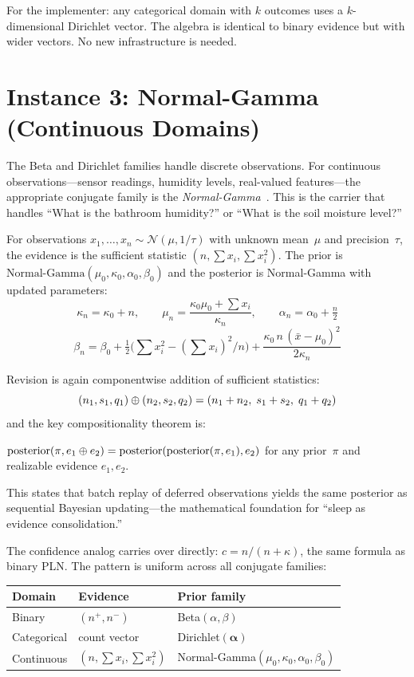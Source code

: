 \documentclass[11pt,openany]{report}
\begin{document}
For the implementer: any categorical domain with $k$ outcomes uses
a $k$-dimensional Dirichlet vector.  The algebra is identical to
binary evidence but with wider vectors.  No new infrastructure is
needed.

\section{Instance 3: Normal-Gamma (Continuous Domains)}
\label{sec:normal-gamma}

The Beta and Dirichlet families handle discrete observations.  For
continuous observations---sensor readings, humidity levels, real-valued
features---the appropriate conjugate family is the
\emph{Normal-Gamma}~\cite{BernardoSmith2000}.  This is the carrier
that handles ``What is the bathroom humidity?'' or ``What is the soil
moisture level?''

For observations $x_1, \ldots, x_n \sim \mathcal{N}(\mu, 1/\tau)$
with unknown mean~$\mu$ and precision~$\tau$, the evidence is the
sufficient statistic $(n, \textstyle\sum x_i, \sum x_i^2)$.  The prior
is $\text{Normal-Gamma}(\mu_0, \kappa_0, \alpha_0, \beta_0)$ and the
posterior is Normal-Gamma with updated parameters:
\[
  \kappa_n = \kappa_0 + n, \qquad
  \mu_n = \frac{\kappa_0 \mu_0 + \sum x_i}{\kappa_n}, \qquad
  \alpha_n = \alpha_0 + \tfrac{n}{2}
\]
\[
  \beta_n = \beta_0
    + \tfrac{1}{2}\bigl(\textstyle\sum x_i^2 - (\sum x_i)^2/n\bigr)
    + \frac{\kappa_0 \, n \, (\bar{x} - \mu_0)^2}{2\kappa_n}
\]

Revision is again componentwise addition of sufficient statistics:
\[
  (n_1, s_1, q_1) \oplus (n_2, s_2, q_2) = (n_1 + n_2,\; s_1 + s_2,\; q_1 + q_2)
\]
and the key compositionality theorem is:
\begin{theorem}
\label{thm:sleep-consolidation}
  $\text{posterior}(\pi, e_1 \oplus e_2)
   = \text{posterior}(\text{posterior}(\pi, e_1), e_2)$
  for any prior~$\pi$ and realizable evidence $e_1, e_2$.
\end{theorem}
This states that batch replay of deferred observations yields the same
posterior as sequential Bayesian updating---the mathematical foundation
for ``sleep as evidence consolidation.''

The confidence analog carries over directly: $c = n/(n + \kappa)$,
the same formula as binary PLN.  The pattern is uniform across all
conjugate families:

\medskip
\begin{center}
\begin{tabular}{lll}
  \textbf{Domain} & \textbf{Evidence} & \textbf{Prior family} \\
  \hline
  Binary  & $(n^+, n^-)$ & Beta$(\alpha, \beta)$ \\
  Categorical & count vector & Dirichlet$(\boldsymbol\alpha)$ \\
  Continuous  & $(n, \sum x_i, \sum x_i^2)$ & Normal-Gamma$(\mu_0, \kappa_0, \alpha_0, \beta_0)$
\end{tabular}
\end{center}
\medskip
\end{document}
